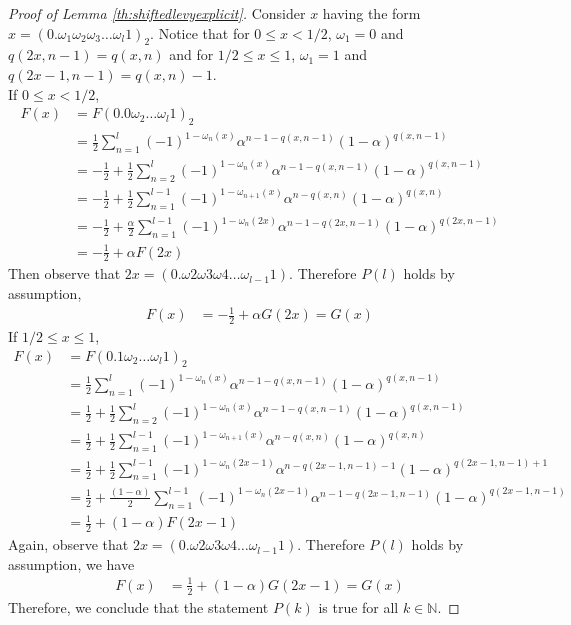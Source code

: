 \documentclass[epsf,10pt]{article}
\begin{document}
\begin{proof}[Proof of Lemma \ref{th:shiftedlevyexplicit}]
Consider $x$ having the form $x=(0.\omega_1\omega_2\omega_3 \dots \omega_{l}1)_2$.
Notice that for $0\leq x<1/2$, $\omega_1=0$ and $q(2x,n-1) = q(x,n)$ and for $1/2 \leq x \leq 1$, $\omega_1=1$ and $q(2x-1,n-1) = q(x,n)-1$.\\
If $0\leq x< 1/2$,
\begin{align*}
    F(x) &= F(0.0 \omega_2\dots\omega_l1)_2\\
    &= \frac{1}{2}\sum_{n=1}^l(-1)^{1-\omega_n(x)}\alpha^{n-1-q(x,n-1)}(1-\alpha)^{q(x,n-1)}\\
    &=-\frac{1}{2}+\frac{1}{2}\sum_{n=2}^l(-1)^{1-\omega_n(x)}\alpha^{n-1-q(x,n-1)}(1-\alpha)^{q(x,n-1)}\\
    &=-\frac{1}{2}+\frac{1}{2}\sum_{n=1}^{l-1}(-1)^{1-\omega_{n+1}(x)}\alpha^{n-q(x,n)}(1-\alpha)^{q(x,n)}\\
    &=-\frac{1}{2}+\frac{\alpha}{2}\sum_{n=1}^{l-1}(-1)^{1-\omega_{n}(2x)}\alpha^{n-1-q(2x,n-1)}(1-\alpha)^{q(2x,n-1)}\\
    &= -\frac{1}{2}+\alpha F(2x)
\end{align*}
Then observe that $2x = (0.\omega2\omega3\omega4\dots\omega_{l-1}1)$.
Therefore $P(l)$ holds by assumption,
\begin{align*}
   F(x) &= -\frac{1}{2}+\alpha G(2x)= G(x)
\end{align*}
If $1/2 \leq x\leq1$,
\begin{align*}
    F(x) &= F(0.1 \omega_2\dots\omega_l1)_2\\
    &= \frac{1}{2}\sum_{n=1}^l(-1)^{1-\omega_n(x)}\alpha^{n-1-q(x,n-1)}(1-\alpha)^{q(x,n-1)}\\
    &=\frac{1}{2}+\frac{1}{2}\sum_{n=2}^l(-1)^{1-\omega_n(x)}\alpha^{n-1-q(x,n-1)}(1-\alpha)^{q(x,n-1)}\\
    &=\frac{1}{2}+\frac{1}{2}\sum_{n=1}^{l-1}(-1)^{1-\omega_{n+1}(x)}\alpha^{n-q(x,n)}(1-\alpha)^{q(x,n)}\\
    &=\frac{1}{2} +\frac{1}{2}\sum_{n=1}^{l-1}(-1)^{1-{\omega_n(2x-1)}}\alpha^{n-q(2x-1,n-1)-1}(1-\alpha)^{q(2x-1,n-1)+1}\\
    &=\frac{1}{2}+\frac{(1-\alpha)}{2}\sum_{n=1}^{l-1}(-1)^{1-\omega_n(2x-1)}\alpha^{n-1-q(2x-1,n-1)}(1-\alpha)^{q(2x-1,n-1)}\\
    &=\frac{1}{2}+(1-\alpha)F(2x-1)
\end{align*}
Again, observe that $2x = (0.\omega2\omega3\omega4\dots\omega_{l-1}1)$.
Therefore $P(l)$ holds by assumption, we have 
\begin{align*}
   F(x) &= \frac{1}{2}+(1-\alpha) G(2x-1)= G(x)
\end{align*}
Therefore, we conclude that the statement $P(k)$ is true for all $k \in \mathbb{N}$.
\end {proof}
\end{document}
